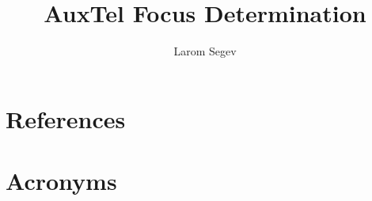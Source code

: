 \documentclass[SE,authoryear,toc]{lsstdoc}
\title{AuxTel Focus Determination}
\author{%
Larom Segev
}
\date{\vcsDate}
\begin{document}
\maketitle


\appendix
\section{References} \label{sec:bib}
\renewcommand{\refname}{} %


\section{Acronyms} \label{sec:acronyms}

\end{document}
